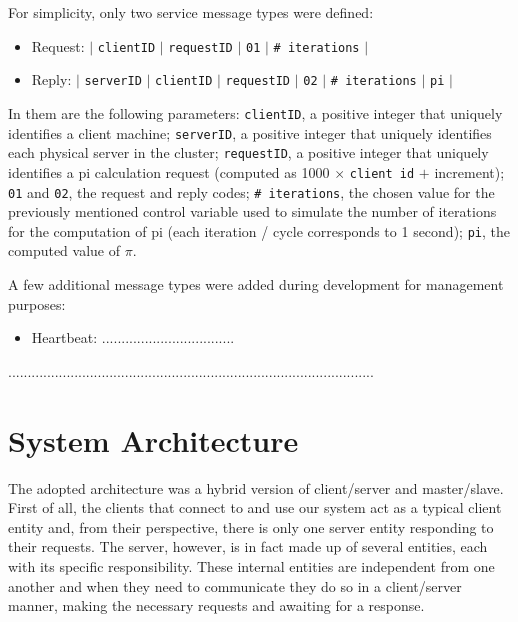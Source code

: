 \documentclass[12pt]{article}
\begin{document}
For simplicity, only two service message types were defined:
\vspace{-10pt}
\begin{itemize}[noitemsep]
  \item Request: $|$ \texttt{clientID} $|$ \texttt{requestID} $|$ \texttt{01} $|$ \texttt{\# iterations} $|$
  \item Reply: $|$ \texttt{serverID} $|$ \texttt{clientID} $|$ \texttt{requestID} $|$ \texttt{02} $|$ \texttt{\# iterations} $|$ \texttt{pi} $|$
\end{itemize}
\vspace{-10pt}
In them are the following parameters:
\texttt{clientID}, a positive integer that uniquely identifies a client machine;
\texttt{serverID}, a positive integer that uniquely identifies each physical server in the cluster;
\texttt{requestID}, a positive integer that uniquely identifies a pi calculation request (computed as 1000 $\times$ \texttt{client id} $+$ increment);
\texttt{01} and \texttt{02}, the request and reply codes;
\texttt{\# iterations}, the chosen value for the previously mentioned control variable used to simulate the number of iterations for the computation of pi
(each iteration / cycle corresponds to 1 second);
\texttt{pi}, the computed value of $\pi$.

A few additional message types were added during development for management purposes:
\vspace{-10pt}
\begin{itemize}[noitemsep]
  \item Heartbeat: ..................................
\end{itemize}
\vspace{-10pt}

..............................................................................................

\newpage
\section{System Architecture} \label{architecture} %

The adopted architecture was a hybrid version of client/server and master/slave.
First of all, the clients that connect to and use our system act as a typical client entity and, from their perspective, there is only one server entity 
responding to their requests.
The server, however, is in fact made up of several entities, each with its specific responsibility.
These internal entities are independent from one another and when they need to communicate they do so in a client/server manner, making the necessary requests 
and awaiting for a response.
\end{document}
